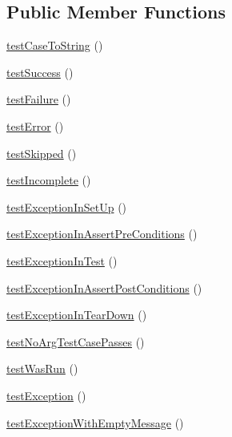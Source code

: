 \subsection*{Public Member Functions}
\begin{DoxyCompactItemize}
\item 
\mbox{\hyperlink{class_framework___test_case_test_a2779e01464fe0af02e48519084df4946}{test\+Case\+To\+String}} ()
\item 
\mbox{\hyperlink{class_framework___test_case_test_a08a071ac504d50530175972e1a53eca9}{test\+Success}} ()
\item 
\mbox{\hyperlink{class_framework___test_case_test_ab4995640dd47ccdf177deb72344da9e0}{test\+Failure}} ()
\item 
\mbox{\hyperlink{class_framework___test_case_test_a1376ff8646da407fae8c31d8fb67eb13}{test\+Error}} ()
\item 
\mbox{\hyperlink{class_framework___test_case_test_a25f2d4be2849dc629109816db8bf4e01}{test\+Skipped}} ()
\item 
\mbox{\hyperlink{class_framework___test_case_test_a5c46571a4bc9b8ca1d821a760e81654b}{test\+Incomplete}} ()
\item 
\mbox{\hyperlink{class_framework___test_case_test_aee9d450cda0a7b9452e9f5a5396aa2e2}{test\+Exception\+In\+Set\+Up}} ()
\item 
\mbox{\hyperlink{class_framework___test_case_test_a5025cedf7774faa857b880b886c533a5}{test\+Exception\+In\+Assert\+Pre\+Conditions}} ()
\item 
\mbox{\hyperlink{class_framework___test_case_test_a1b36e71d961b93558957c68c30dcbb40}{test\+Exception\+In\+Test}} ()
\item 
\mbox{\hyperlink{class_framework___test_case_test_a5b7adddb36718b89756312b5957a835c}{test\+Exception\+In\+Assert\+Post\+Conditions}} ()
\item 
\mbox{\hyperlink{class_framework___test_case_test_a120faa1e9a9caddb3ba02b5475c29cb6}{test\+Exception\+In\+Tear\+Down}} ()
\item 
\mbox{\hyperlink{class_framework___test_case_test_ab418d2773b865ee580f922efe645b199}{test\+No\+Arg\+Test\+Case\+Passes}} ()
\item 
\mbox{\hyperlink{class_framework___test_case_test_a8284632b685b76ca9b31cb6bd58cfb48}{test\+Was\+Run}} ()
\item 
\mbox{\hyperlink{class_framework___test_case_test_a4ae4fb14577c6ec366041bab6ffb43dd}{test\+Exception}} ()
\item 
\mbox{\hyperlink{class_framework___test_case_test_aa1cf4bccc658155172221df0aa44899f}{test\+Exception\+With\+Empty\+Message}} ()

\end{DoxyCompactItemize}
